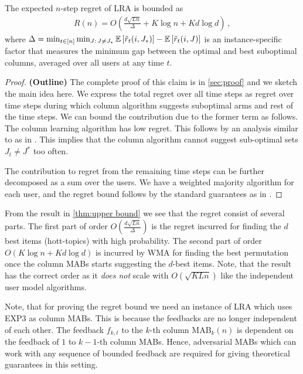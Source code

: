 
\begin{theorem}
\label{thm:upper bounded} The expected $n$-step regret of LRA is bounded as
\begin{align*}
  R(n) =
  O\left(\frac{d \sqrt{L n}}{\Delta} + K \log n + K d \log d\right)\,,
\end{align*}
where $\Delta = \min_{t \in [n]} \min_{J:\, J \neq J_\ast} \mathbb{E}\left[\tilde{r}_t(i, J_\ast)\right] - \mathbb{E}\left[\tilde{r}_t(i, J)\right]$ is an instance-specific factor that measures the minimum gap between the optimal and best suboptimal columns, averaged over all users at any time $t$.
\end{theorem}

\begin{proof} \textbf{(Outline)}
The complete proof of this claim is in \cref{sec:proof} and we sketch the main idea here.  We  express the total regret over all time steps as regret over time steps during which column algorithm suggests suboptimal arms and rest of the time steps. We can bound the contribution due to the former term as follows. The column learning algorithm has  low regret. This follows by an analysis similar to as in \cite{radlinski2008learning}. This implies that the column algorithm cannot suggest sub-optimal sets $J_t \neq J^*$ too often. 

The contribution to regret from the remaining time steps can be further decomposed as a sum over the users. We have a weighted majority algorithm for each user, and the regret bound follows by the standard guarantees as in \citet{littlestone1994weighted}.
\end{proof}

From the result in \cref{thm:upper bound} we see that the regret consist of several parts. The first part of order $O\left(\frac{d \sqrt{L n}}{\Delta} \right)$ is the regret incurred for finding the $d$ best items (hott-topics) with high probability. The second part of order $O\left( K\log n + K d \log d\right)$ is incurred by WMA for finding the best permutation once the column MABs starts suggesting the $d$-best items. Note, that the result has the correct order as it \textit{does not} scale with $O\left(\sqrt{KLn}\right)$ like the independent user model algorithms.

Note, that for proving the regret bound we need an instance of LRA which uses EXP3 \citep{auer2002finite} as column MABs. This is because the feedbacks are no longer independent of each other. The feedback $f_{k,t}$ to the $k$-th column MAB$_k(n)$  is dependent on the feedback of $1$ to $k-1$-th column MABs. Hence, adversarial MABs which can work with any sequence of bounded feedback are required for giving theoretical guarantees in this setting.
